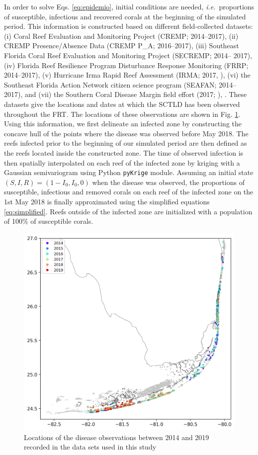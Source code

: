 \documentclass[utf8]{frontiersSCNS}
\newcommand{\ie}{{\it i.e.}\ }
\newcommand{\dobby}[1]{\textbf{\color{violet}{#1}}}
\begin{document}
In order to solve Eqs. \ref{eq:epidemio}, initial conditions are needed, \ie proportions of susceptible, infectious and recovered corals at the beginning of the simulated period. This information is constructed based on different field-collected datasets: (i) Coral Reef Evaluation and Monitoring Project (CREMP; 2014–2017), (ii) CREMP Presence/Absence Data (CREMP P\_A; 2016–2017), (iii) Southeast Florida Coral Reef Evaluation and Monitoring Project (SECREMP; 2014– 2017), (iv) Florida Reef Resilience Program Disturbance Response Monitoring (FRRP; 2014–2017), (v) Hurricane Irma Rapid Reef Assessment (IRMA; 2017, \cite{viehman2018}), (vi) the Southeast Florida Action Network citizen science program (SEAFAN; 2014–2017), and (vii) the Southern Coral Disease Margin field effort (2017; \cite{neely2018surveying}), \dobby{[I guess that 2018-2019 data sets should be added here]}. These datasets give the locations and dates at which the SCTLD has been observed throughout the FRT. The locations of these observations are shown in Fig. \ref{fig:stns}. Using this information, we first delineate an infected zone by constructing the concave hull of the points where the disease was observed before May 2018. The reefs infected prior to the beginning of our simulated period are then defined as the reefs located inside the constructed zone. The time of observed infection is then spatially interpolated on each reef of the infected zone by kriging with a Gaussian semivariogram using Python \texttt{pyKrige} module. Assuming an initial state $(S,I,R)=(1-I_0, I_0, 0)$ when the disease was observed, the proportions of susceptible, infectious and removed corals on each reef of the infected zone on the 1st May 2018 is finally approximated using the simplified equations \ref{eq:simplified}. Reefs outside of the infected zone are initialized with a population of 100\% of susceptible corals.  

\begin{figure}
    \center
    \includegraphics[width=.6\textwidth]{figures/monitoring.png}
    \caption{Locations of the disease observations between 2014 and 2019 recorded in the data sets used in this study}
    \label{fig:stns}
\end{figure}
\end{document}
